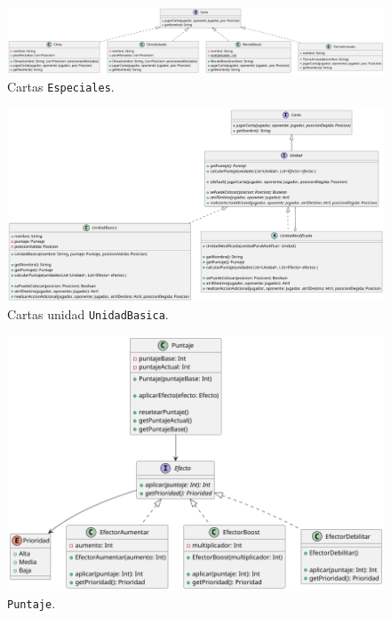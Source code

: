 \documentclass[titlepage,a4paper]{article}
\begin{document}
	\begin{figure}[H]
		\centering
		\includegraphics[width=1\textwidth]{diagramas/clases/Especiales}
		\caption{\label{fig:class05} Cartas \texttt{Especiales}.}
	\end{figure}

	\begin{figure}[H]
		\centering
		\includegraphics[width=1\textwidth]{diagramas/clases/UnidadBasica}
		\caption{\label{fig:class06}Cartas unidad \texttt{UnidadBasica}.}
	\end{figure}

	\begin{figure}[H]
		\centering
		\includegraphics[width=1\textwidth]{diagramas/clases/Puntaje}
		\caption{\label{fig:class07}\texttt{Puntaje}.}
	\end{figure}
\end{document}
